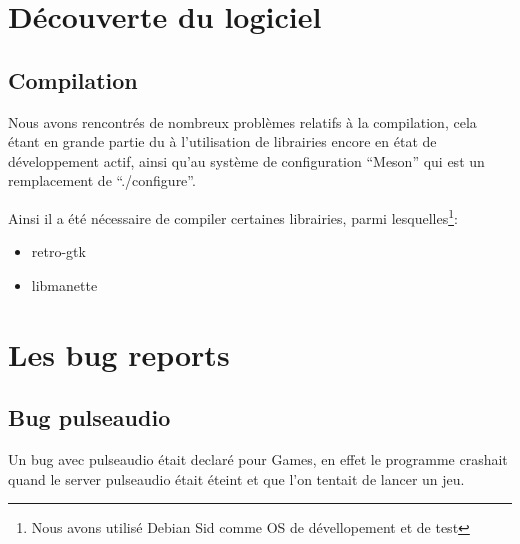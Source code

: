 \documentclass[12pt]{report}
\begin{document}
\section{Découverte du logiciel}
\subsection{Compilation}
Nous avons rencontrés de nombreux problèmes relatifs à la compilation,
cela étant en grande partie du à l'utilisation de librairies encore en
état de développement actif, ainsi qu'au système de configuration
``Meson'' qui est un remplacement de ``./configure''.

Ainsi il a été nécessaire de compiler certaines librairies, parmi
lesquelles\footnote{Nous avons utilisé Debian Sid comme OS de dévellopement et de test}:
\begin{itemize}
\item retro-gtk
\item libmanette
\end{itemize}


\section{Les bug reports}
\subsection{Bug pulseaudio}
Un bug avec pulseaudio était declaré pour Games, en effet le programme crashait
quand le server pulseaudio était éteint et que l'on tentait de lancer
un jeu.
\end{document}

